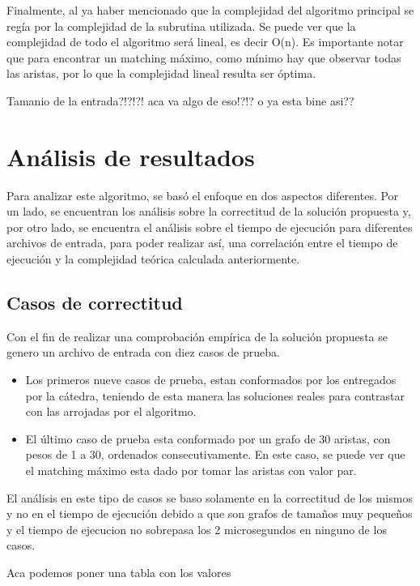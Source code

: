 \documentclass[a4paper, 12pt]{article}
\begin{document}
Finalmente, al ya haber mencionado que la complejidad del algoritmo principal se reg\'ia por la complejidad de la subrutina utilizada. Se puede ver que la complejidad de todo el algoritmo ser\'a lineal, es decir O(n). Es importante notar que para encontrar un matching m\'aximo, como m\'inimo hay que observar todas las aristas, por lo que la complejidad lineal resulta ser \'optima.

Tamanio de la entrada?!?!?! aca va algo de eso!?!? o ya esta bine asi??


\section*{An\'alisis de resultados}

Para analizar este algoritmo, se bas\'o el enfoque en dos aspectos diferentes. Por un lado, se encuentran los an\'alisis sobre la correctitud de la soluci\'on propuesta y, por otro lado, se encuentra el an\'alisis sobre el tiempo de ejecuci\'on para diferentes archivos de entrada, para poder realizar as\'i, una correlaci\'on entre el tiempo de ejecuci\'on y la complejidad te\'orica calculada anteriormente.

\subsection*{Casos de correctitud}
Con el fin de realizar una comprobaci\'on emp\'irica de la soluci\'on propuesta se genero un archivo de entrada con diez casos de prueba.
\begin{itemize}
\item Los primeros nueve casos de prueba, estan conformados por los entregados por la c\'atedra, teniendo de esta manera las soluciones reales para contrastar con las arrojadas por el algoritmo.
\item El \'ultimo caso de prueba esta conformado por un grafo de 30 aristas, con pesos de 1 a 30, ordenados consecutivamente. En este caso, se puede ver que el matching m\'aximo esta dado por tomar las aristas con valor par.
\end{itemize}

El an\'alisis en este tipo de casos se baso solamente en la correctitud de los mismos y no en el tiempo de ejecuci\'on debido a que son grafos de tama\~{n}os muy peque\~{n}os y el tiempo de ejecucion no sobrepasa los 2 microsegundos en ninguno de los casos.

\bigskip
Aca podemos poner una tabla con los valores
\end{document}
